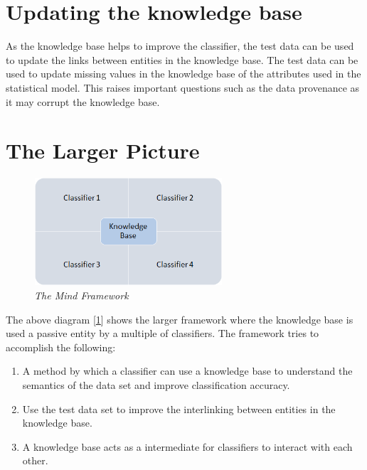 \documentclass[paper=a4, fontsize=11pt]{scrartcl}
\numberwithin{equation}{section}
\numberwithin{figure}{section}
\numberwithin{table}{section}
\begin{document}
\section{Updating the knowledge base}
As the knowledge base helps to improve the classifier, the test data can be used to update the links between entities in the knowledge base. The test data can be used to update missing values in the knowledge base of the attributes used in the statistical model. This raises important questions such as the data provenance as it may corrupt the knowledge base.

\section{The Larger Picture}
\begin{figure}[h]
	\centering
	\includegraphics[width=7cm,height=4cm]{big_picture.png}
	\caption{\textit{The Mind Framework}}
	\label{lp}
\end{figure}
The above diagram [\ref{lp}] shows the larger framework where the knowledge base is used a passive entity by a multiple of classifiers. The framework tries to accomplish the following:
\begin{enumerate}
\item A method by which a classifier can use a knowledge base to understand the semantics of the data set and improve classification accuracy.
\item Use the test data set to improve the interlinking between entities in the knowledge base.
\item A knowledge base acts as a intermediate for classifiers to interact with each other.
\end{enumerate}

{}

\end{document}
